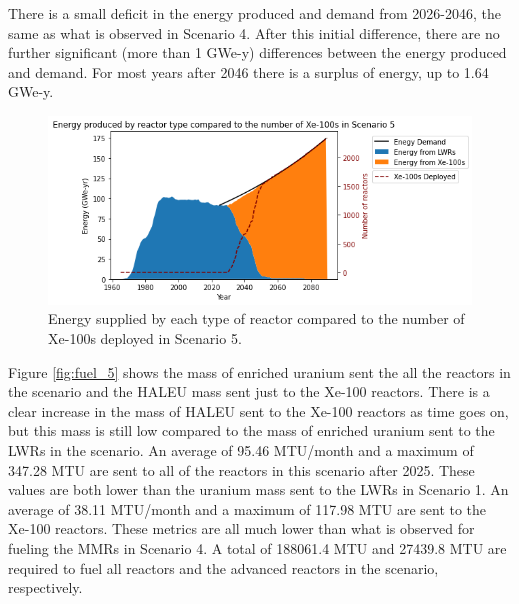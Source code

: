 There is a small deficit in the energy produced and demand from 
2026-2046, the same as what is observed in Scenario 4. After this 
initial difference, there are no further significant (more than 
1 GWe-y) differences between 
the energy produced and demand. For most years after 2046 there 
is a surplus of energy, up to 1.64 GWe-y. 

\begin{figure}
    \centering 
    \includegraphics[width=\textwidth]{../figures/energy_scenario5.png}
    \caption{Energy supplied by each type of reactor compared to the number of 
    Xe-100s deployed in Scenario 5.}
    \label{fig:energy_rx_5}
\end{figure}

Figure \ref{fig:fuel_5} shows the mass of enriched uranium sent the all  
the reactors in the scenario and the \gls{HALEU} mass sent just to the 
Xe-100 reactors. There is a clear increase in the mass of \gls{HALEU} sent 
to the Xe-100 reactors as time goes on, but this mass is still  
low compared to the mass of enriched uranium sent to the \glspl{LWR} in 
the scenario. An average of 95.46 MTU/month and a maximum of 347.28 MTU 
are sent to all of the reactors in this scenario after 2025. These 
values are both lower than the uranium mass sent to the 
\glspl{LWR} in Scenario 1. An average of 
38.11 MTU/month and a maximum of 117.98 MTU are sent to the Xe-100 reactors. 
These metrics are all much lower than what is observed 
for fueling the \glspl{MMR} in Scenario 4. A total of 188061.4 MTU and 
27439.8 MTU are required to fuel all reactors and the advanced reactors 
in the scenario, respectively.


